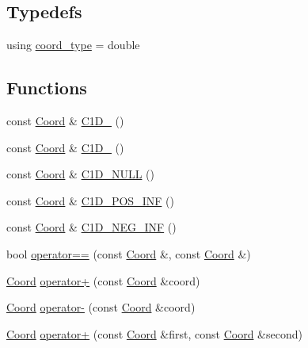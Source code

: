 \subsection*{Typedefs}
\begin{DoxyCompactItemize}
\item 
using \hyperlink{namespaceMcCAD_1_1Geometry_ac043b37a4a7e849fca22869e1982d2f8}{coord\+\_\+type} = double
\end{DoxyCompactItemize}
\subsection*{Functions}
\begin{DoxyCompactItemize}
\item 
const \hyperlink{classMcCAD_1_1Geometry_1_1Coord}{Coord} \& \hyperlink{namespaceMcCAD_1_1Geometry_aef0aab16ba6382b032e4e3a8a5d37b94}{C1\+D\+\_} ()
\item 
const \hyperlink{classMcCAD_1_1Geometry_1_1Coord}{Coord} \& \hyperlink{namespaceMcCAD_1_1Geometry_ad7994c2ae088570476d26d338aa22cff}{C1\+D\+\_} ()
\item 
const \hyperlink{classMcCAD_1_1Geometry_1_1Coord}{Coord} \& \hyperlink{namespaceMcCAD_1_1Geometry_ab581ddc27c8a6530d9c1657b77ffe0bf}{C1\+D\+\_\+\+N\+U\+LL} ()
\item 
const \hyperlink{classMcCAD_1_1Geometry_1_1Coord}{Coord} \& \hyperlink{namespaceMcCAD_1_1Geometry_af4743431c44b10918e128421340b6364}{C1\+D\+\_\+\+P\+O\+S\+\_\+\+I\+NF} ()
\item 
const \hyperlink{classMcCAD_1_1Geometry_1_1Coord}{Coord} \& \hyperlink{namespaceMcCAD_1_1Geometry_a2704f8b3e303906d7e8928cada1c1647}{C1\+D\+\_\+\+N\+E\+G\+\_\+\+I\+NF} ()
\item 
bool \hyperlink{namespaceMcCAD_1_1Geometry_a3985665b80ce51ad272be8c327c2b57e}{operator==} (const \hyperlink{classMcCAD_1_1Geometry_1_1Coord}{Coord} \&, const \hyperlink{classMcCAD_1_1Geometry_1_1Coord}{Coord} \&)
\item 
\hyperlink{classMcCAD_1_1Geometry_1_1Coord}{Coord} \hyperlink{namespaceMcCAD_1_1Geometry_a94290461e4f041c320957ca768de9012}{operator+} (const \hyperlink{classMcCAD_1_1Geometry_1_1Coord}{Coord} \&coord)
\item 
\hyperlink{classMcCAD_1_1Geometry_1_1Coord}{Coord} \hyperlink{namespaceMcCAD_1_1Geometry_a0936188f672a7cfe51aaefc674e3ab5f}{operator-\/} (const \hyperlink{classMcCAD_1_1Geometry_1_1Coord}{Coord} \&coord)
\item 
\hyperlink{classMcCAD_1_1Geometry_1_1Coord}{Coord} \hyperlink{namespaceMcCAD_1_1Geometry_a77561412a1bc5f4077dd73172b957096}{operator+} (const \hyperlink{classMcCAD_1_1Geometry_1_1Coord}{Coord} \&first, const \hyperlink{classMcCAD_1_1Geometry_1_1Coord}{Coord} \&second)

\end{DoxyCompactItemize}
